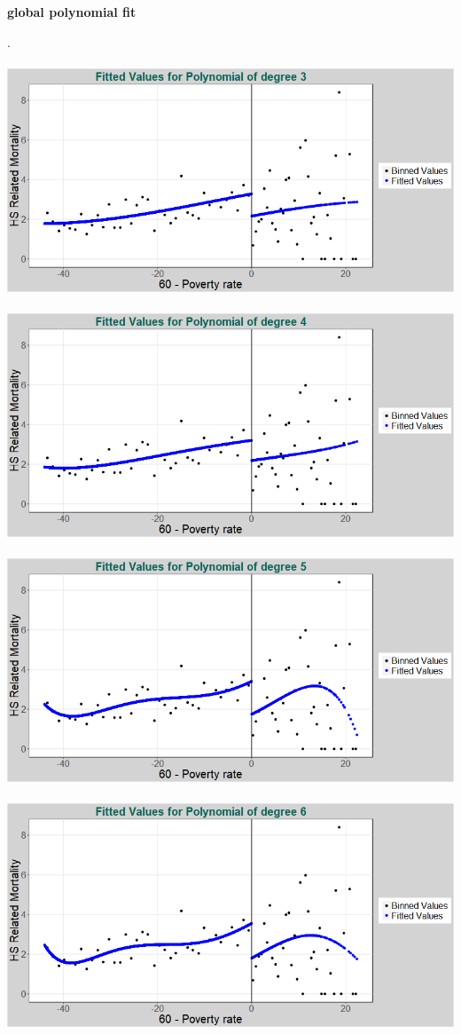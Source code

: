 \documentclass[11pt]{article}
\begin{document}
\begin{center}
	\centering
	\textbf{global polynomial fit}\par\medskip
	\scalebox{1}{
		
	}
\end{center}
 .
\\ \\


\includegraphics[width=.8\linewidth]{plot_221_poly_3.png}
\\ \\
\includegraphics[width=.8\linewidth]{plot_221_poly_4.png}
\\ \\
\includegraphics[width=.8\linewidth]{plot_221_poly_5.png}
\\ \\
\includegraphics[width=.8\linewidth]{plot_221_poly_6.png}
\end{document}
